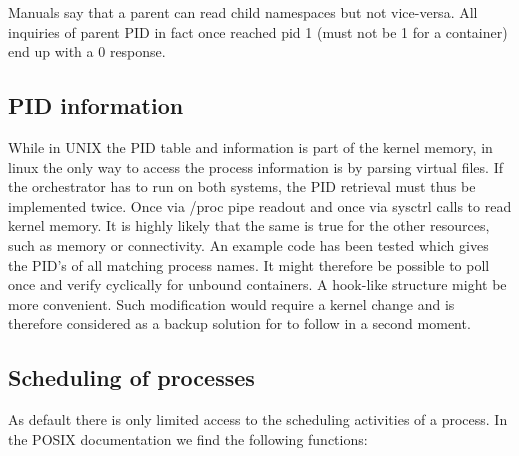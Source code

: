\documentclass[]{scrartcl}
\begin{document}
Manuals say that a parent can read child namespaces but not vice-versa. All inquiries of parent PID in fact once reached pid 1 (must not be 1 for a container) end up with a 0 response.

\subsection{PID information}
\label{sub:pidinf}

While in UNIX the PID table and information is part of the kernel memory, in linux the only way to access the process information is by parsing virtual files. 
If the orchestrator has to run on both systems, the PID retrieval must thus be implemented twice. Once via /proc pipe readout and once via sysctrl calls to read kernel memory.
It is highly likely that the same is true for the other resources, such as memory or connectivity. 
An example code has been tested which gives the PID's of all matching process names. 
It might therefore be possible to poll once and verify cyclically for unbound containers. 
A hook-like structure might be more convenient. Such modification would require a kernel change and is therefore considered as a backup solution for to follow in a second moment.

\subsection{Scheduling of processes}

As default there is only limited access to the scheduling activities of a process.
In the POSIX documentation we find the following functions:
\end{document}
